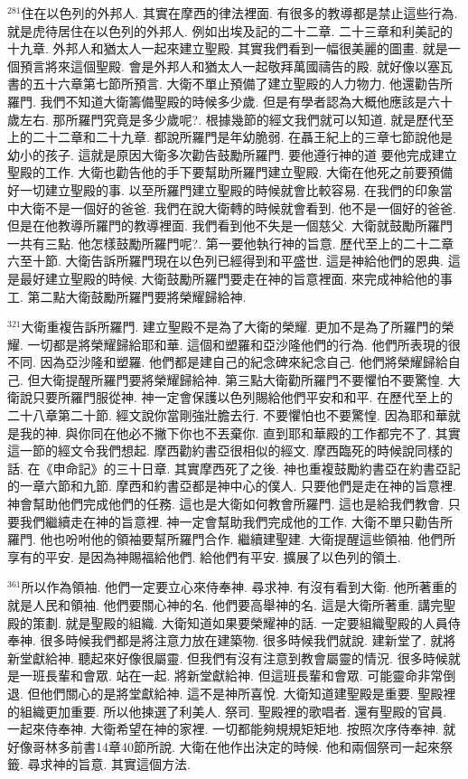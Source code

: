 \documentclass{book}
\begin{document}
$^{281}$住在以色列的外邦人.
其實在摩西的律法裡面.
有很多的教導都是禁止這些行為.
就是虎待居住在以色列的外邦人.
例如出埃及記的二十二章.
二十三章和利美記的十九章.
外邦人和猶太人一起來建立聖殿.
其實我們看到一幅很美麗的圖畫.
就是一個預言將來這個聖殿.
會是外邦人和猶太人一起敬拜萬國禱告的殿.
就好像以塞瓦書的五十六章第七節所預言.
大衛不單止預備了建立聖殿的人力物力.
他還勸告所羅門.
我們不知道大衛籌備聖殿的時候多少歲.
但是有學者認為大概他應該是六十歲左右.
那所羅門究竟是多少歲呢?.
根據幾節的經文我們就可以知道.
就是歷代至上的二十二章和二十九章.
都說所羅門是年幼脆弱.
在聶王紀上的三章七節說他是幼小的孩子.
這就是原因大衛多次勸告鼓勵所羅門.
要他遵行神的道 要他完成建立聖殿的工作.
大衛也勸告他的手下要幫助所羅門建立聖殿.
大衛在他死之前要預備好一切建立聖殿的事.
以至所羅門建立聖殿的時候就會比較容易.
在我們的印象當中大衛不是一個好的爸爸.
我們在說大衛轉的時候就會看到.
他不是一個好的爸爸.
但是在他教導所羅門的教導裡面.
我們看到他不失是一個慈父.
大衛就鼓勵所羅門一共有三點.
他怎樣鼓勵所羅門呢?.
第一要他執行神的旨意.
歷代至上的二十二章六至十節.
大衛告訴所羅門現在以色列已經得到和平盛世.
這是神給他們的恩典.
這是最好建立聖殿的時候.
大衛鼓勵所羅門要走在神的旨意裡面.
來完成神給他的事工.
第二點大衛鼓勵所羅門要將榮耀歸給神.

$^{321}$大衛重複告訴所羅門.
建立聖殿不是為了大衛的榮耀.
更加不是為了所羅門的榮耀.
一切都是將榮耀歸給耶和華.
這個和塑羅和亞沙隆他們的行為.
他們所表現的很不同.
因為亞沙隆和塑羅.
他們都是建自己的紀念碑來紀念自己.
他們將榮耀歸給自己.
但大衛提醒所羅門要將榮耀歸給神.
第三點大衛勸所羅門不要懼怕不要驚惶.
大衛說只要所羅門服從神.
神一定會保護以色列賜給他們平安和和平.
在歷代至上的二十八章第二十節.
經文說你當剛強壯膽去行.
不要懼怕也不要驚惶.
因為耶和華就是我的神.
與你同在他必不撇下你也不丟棄你.
直到耶和華殿的工作都完不了.
其實這一節的經文令我們想起.
摩西勸約書亞很相似的經文.
摩西臨死的時候說同樣的話.
在《申命記》的三十日章.
其實摩西死了之後.
神也重複鼓勵約書亞在約書亞記的一章六節和九節.
摩西和約書亞都是神中心的僕人.
只要他們是走在神的旨意裡.
神會幫助他們完成他們的任務.
這也是大衛如何教會所羅門.
這也是給我們教會.
只要我們繼續走在神的旨意裡.
神一定會幫助我們完成他的工作.
大衛不單只勸告所羅門.
他也吩咐他的領袖要幫所羅門合作.
繼續建聖建.
大衛提醒這些領袖.
他們所享有的平安.
是因為神賜福給他們.
給他們有平安.
擴展了以色列的領土.

$^{361}$所以作為領袖.
他們一定要立心來侍奉神.
尋求神.
有沒有看到大衛.
他所著重的就是人民和領袖.
他們要關心神的名.
他們要高舉神的名.
這是大衛所著重.
講完聖殿的策劃.
就是聖殿的組織.
大衛知道如果要榮耀神的話.
一定要組織聖殿的人員侍奉神.
很多時候我們都是將注意力放在建築物.
很多時候我們就說.
建新堂了.
就將新堂獻給神.
聽起來好像很屬靈.
但我們有沒有注意到教會屬靈的情況.
很多時候就是一班長輩和會眾.
站在一起.
將新堂獻給神.
但這班長輩和會眾.
可能靈命非常倒退.
但他們關心的是將堂獻給神.
這不是神所喜悅.
大衛知道建聖殿是重要.
聖殿裡的組織更加重要.
所以他揀選了利美人.
祭司.
聖殿裡的歌唱者.
還有聖殿的官員.
一起來侍奉神.
大衛希望在神的家裡.
一切都能夠規規矩矩地.
按照次序侍奉神.
就好像哥林多前書14章40節所說.
大衛在他作出決定的時候.
他和兩個祭司一起來祭籤.
尋求神的旨意.
其實這個方法.
\end{document}
